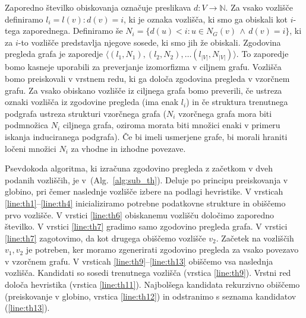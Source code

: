\documentclass[a4paper, 12pt, ]{book}
\newcommand{\refalg}[1]{(Alg.~\ref{#1})}
\begin{document}
	Zaporedno številko obiskovanja označuje preslikava $d : V \to \mathbb{N}$. Za vsako vozlišče definiramo $l_i = l(v): d(v) = i$, ki je oznaka vozlišča,
	ki smo ga obiskali kot $i$-tega zaporednega. Definiramo še $N_i = \{ d(u) < i: u \in N_G(v) \, \wedge \, d(v) = i\}$, ki za $i$-to vozlišče predstavlja
	njegove sosede, ki smo jih že obiskali. Zgodovina pregleda grafa je zaporedje $\langle (l_1, N_1), (l_2, N_2), \ldots (l_{|V|}, N_{|V|})\rangle$. To
	zaporedje bomo kasneje uporabili za preverjanje izomorfizma v ciljnem grafu. Vozlišča bomo preiskovali v vrstnem redu, ki ga določa zgodovina pregleda
	v vzorčnem grafu. Za vsako obiskano vozlišče iz ciljnega grafa bomo preverili, če ustreza oznaki vozlišča iz zgodovine pregleda (ima enak $l_i$) in če
	struktura trenutnega podgrafa ustreza strukturi vzorčnega grafa ($N_i$ vzorčnega grafa mora biti podmnožica $N_i$ ciljnega grafa, oziroma morata biti
	množici enaki v primeru iskanja induciranega podgrafa). Če bi imeli usmerjene grafe, bi morali hraniti ločeni množici $N_i$ za vhodne in izhodne
	povezave.
	
	Psevdokoda algoritma, ki izračuna zgodovino pregleda z začetkom v dveh podanih vozliščih, je v~\refalg{alg:sub_th}. Deluje po principu preiskovanja
	v globino, pri čemer naslednje vozlišče izbere na podlagi hevristike. V vrsticah \ref{line:th1}--\ref{line:th4} inicializiramo potrebne podatkovne strukture
	in obiščemo prvo vozlišče. V vrstici \ref{line:th6} obiskanemu vozlišču določimo zaporedno številko. V vrstici \ref{line:th7} gradimo samo zgodovino
	pregleda grafa. V vrstici \ref{line:th7} zagotovimo, da kot drugega obiščemo vozlišče $v_2$. Začetek na vozliščih $v_1, v_2$ je potreben, ker moramo 
	zgenerirati zgodovino pregleda za vsako povezavo v vzorčnem grafu. V vrsticah \ref{line:th9}--\ref{line:th13} obiščemo vsa naslednja vozlišča. Kandidati
	so sosedi trenutnega vozlišča (vrstica \ref{line:th9}). Vrstni red določa hevristika (vrstica \ref{line:th11}). Najbolšega kandidata rekurzivno obiščemo
	(preiskovanje v globino, vrstica \ref{line:th12}) in odstranimo s seznama kandidatov (\ref{line:th13}).
	
\end{document}
